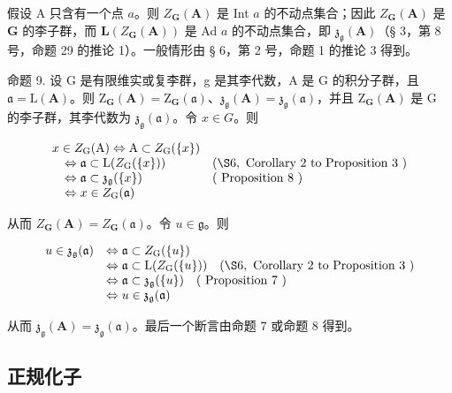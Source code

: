 假设 A 只含有一个点 \(a\)。则 \(Z_{\mathbf{G}}(\mathbf{A})\) 是 Int \(a\) 的不动点集合；因此 \(Z_{\mathbf{G}}(\mathbf{A})\) 是 \(\mathbf{G}\) 的李子群，而 \(\mathbf{L}(Z_{\mathbf{G}}(\mathbf{A}))\) 是 Ad \(a\) 的不动点集合，即 \(\mathfrak{z}_{\mathfrak{g}}(\mathbf{A})\)（§ 3，第 8 号，命题 29 的推论 1）。一般情形由 § 6，第 2 号，命题 1 的推论 3 得到。

命题 9. 设 G 是有限维实或复李群，g 是其李代数，A 是 G 的积分子群，且 \(\mathfrak{a} = \mathrm{L}(\mathbf{A})\)。则 \(\mathrm{Z}_{\mathbf{G}}(\mathbf{A}) = \mathrm{Z}_{\mathbf{G}}(\mathfrak{a})\)、\(\mathfrak{z}_{\mathfrak{g}}(\mathbf{A}) = \mathfrak{z}_{\mathfrak{g}}(\mathfrak{a})\)，并且 \(\mathrm{Z}_{\mathbf{G}}(\mathbf{A})\) 是 G 的李子群，其李代数为 \(\mathfrak{z}_{\mathfrak{g}}(\mathfrak{a})\)。令 \(x \in G\)。则

\[
\begin{array}{l l} x \in Z _ {\mathrm{G}} (\mathrm{A}) \Leftrightarrow \mathrm{A} \subset Z _ {\mathrm{G}} (\{x \}) \\ \quad \Leftrightarrow \mathfrak {a} \subset \mathrm{L} (Z _ {\mathrm{G}} (\{x \})) & (\S 6, \text { Corollary   2   to   Proposition   3 }) \\ \quad \Leftrightarrow \mathfrak {a} \subset \mathfrak {z}_ {\mathfrak {g}} (\{x \}) & (\text { Proposition   8 }) \\ \quad \Leftrightarrow x \in Z _ {\mathrm{G}} (\mathfrak {a}) \end{array}
\]

从而 \(Z_{\mathbf{G}}(\mathbf{A}) = Z_{\mathbf{G}}(\mathfrak{a})\)。令 \(u \in \mathfrak{g}\)。则

\[
\begin{array}{r l} u \in \mathfrak{z}_{\mathfrak{g}}(\mathfrak{a}) & \Leftrightarrow \mathfrak{a} \subset Z_{\mathrm{G}} (\{u\}) \\ & \Leftrightarrow \mathfrak{a} \subset \mathrm{L} (Z_{\mathrm{G}} (\{u\})) \quad (\S 6, \text { Corollary   2   to   Proposition   3 }) \\ & \Leftrightarrow \mathfrak{a} \subset \mathfrak{z}_{\mathfrak{g}} (\{u\}) \quad (\text { Proposition   7 }) \\ & \Leftrightarrow u \in \mathfrak{z}_{\mathfrak{g}} (\mathfrak{a}) \end{array}
\]

从而 \(\mathfrak{z}_{\mathfrak{g}}(\mathbf{A}) = \mathfrak{z}_{\mathfrak{g}}(\mathfrak{a})\)。最后一个断言由命题 7 或命题 8 得到。

\subsection{正规化子}

